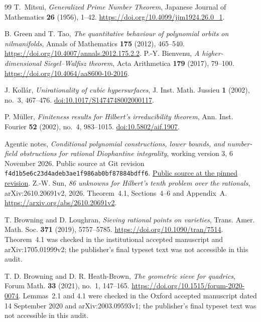 \documentclass[11pt]{article}
\theoremstyle{definition}
\theoremstyle{remark}
\begin{document}
\begin{thebibliography}{99}
T.~Mitsui,
\emph{Generalized Prime Number Theorem},
Japanese Journal of Mathematics \textbf{26} (1956), 1--42.
\url{https://doi.org/10.4099/jjm1924.26.0_1}.

B. Green and T. Tao, \emph{The quantitative behaviour of polynomial
orbits on nilmanifolds}, Annals of Mathematics \textbf{175} (2012), 465--540.
\url{https://doi.org/10.4007/annals.2012.175.2.2}.
P.-Y. Bienvenu, \emph{A higher-dimensional Siegel--Walfisz theorem},
Acta Arithmetica \textbf{179} (2017), 79--100.
\url{https://doi.org/10.4064/aa8600-10-2016}.

 J. Koll\'ar,
\emph{Unirationality of cubic hypersurfaces},
J. Inst. Math. Jussieu \textbf{1} (2002), no.~3, 467--476.
\href{https://doi.org/10.1017/S1474748002000117}{doi:10.1017/S1474748002000117}.

 P. M\"uller,
\emph{Finiteness results for Hilbert's irreducibility theorem},
Ann. Inst. Fourier \textbf{52} (2002), no.~4, 983--1015.
\href{https://doi.org/10.5802/aif.1907}{doi:10.5802/aif.1907}.

 Agentic notes,
\emph{Conditional polynomial constructions, lower bounds, and number-field
obstructions for rational Diophantine integrality}, working version 3,
6 November 2026. Public source at Git revision
\nolinkurl{f4d1b5e6c23d4adeb3ae1f986ab0bf87884bdff6}.
\href{https://github.com/JoseBrox/diophantine-z-q_improvements/blob/f4d1b5e6c23d4adeb3ae1f986ab0bf87884bdff6/paper/diophantine_optimization_20261106_v3.tex}{Public source at the pinned revision}.
Z.-W. Sun, \emph{86 unknowns for Hilbert's tenth problem over the rationals},
arXiv:2610.20691v2, 2026. Theorem~4.1, Sections~4--6 and Appendix~A.
\url{https://arxiv.org/abs/2610.20691v2}.

T. Browning and D. Loughran, \emph{Sieving rational points on varieties},
Trans. Amer. Math. Soc. \textbf{371} (2019), 5757--5785.
\url{https://doi.org/10.1090/tran/7514}.
Theorem~4.1 was checked in the institutional accepted manuscript and
arXiv:1705.01999v2; the publisher's final typeset text was not accessible
in this audit.

T. D. Browning and D. R. Heath-Brown, \emph{The geometric sieve for quadrics},
Forum Math. \textbf{33} (2021), no.~1, 147--165.
\url{https://doi.org/10.1515/forum-2020-0074}.
Lemmas~2.1 and 4.1 were checked in the Oxford accepted manuscript dated
14 September 2020 and arXiv:2003.09593v1; the publisher's final typeset
text was not accessible in this audit.


\end{thebibliography}
\end{document}
